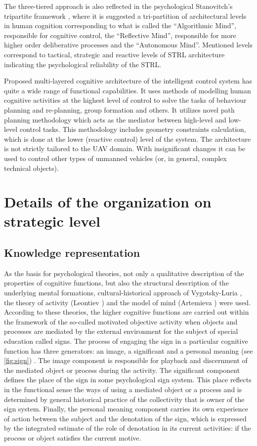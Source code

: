 \documentclass[review]{elsarticle}
\begin{document}
The three-tiered approach is also reflected in the psychological Stanovitch's tripartite framework \cite{Stanovich2009}, where it is suggested a tri-partition of architectural levels in human cognition corresponding to what is called the ``Algorithmic Mind'', responsible for cognitive control, the ``Reflective Mind'', responsible for more higher order deliberative processes and the ``Autonomous Mind''. Mentioned levels correspond to tactical, strategic and reactive levels of STRL architecture indicating the psychological reliability of the STRL.

Proposed multi-layered cognitive architecture of the intelligent control system has quite a wide range of functional capabilities. It uses methods of modelling human cognitive activities at the highest level of control to solve the tasks of behaviour planning and re-planning, group formation and others. It utilizes novel path planning methodology which acts as the mediator between high-level and low-level control tasks. This methodology includes geometry constraints calculation, which is done at the lower (reactive control) level of the system. The architecture is not strictly tailored to the UAV domain. With insignificant changes it can be used to control other types of unmanned vehicles (or, in general, complex technical objects).

\section{Details of the organization on strategic level}\label{sec:strategic}
\subsection{Knowledge representation}
As the basis for psychological theories, not only a qualitative description of the properties of cognitive functions, but also the structural description of the underlying mental formations, cultural-historical approach of Vygotsky-Luria \cite{Vygotsky1986}, the theory of activity (Leontiev \cite{Leontiev2009}) and the model of mind (Artemieva \cite{Artemieva1999}) were used. According to these theories, the higher cognitive functions are carried out within the framework of the so-called motivated objective activity when objects and processes are mediated by the external environment for the subject of special education called signs. The process of engaging the sign in a particular cognitive function has three generators: an image, a significant and a personal meaning (see \autoref{fig:sign}) \cite{Osipov2014}. The image component is responsible for playback and discernment of the mediated object or process during the activity. The significant component defines the place of the sign in some psychological sign system. This place reflects in the functional sense the ways of using a mediated object or a process and is determined by general historical practice of the collectivity that is owner of the sign system. Finally, the personal meaning component carries its own experience of action between the subject and the denotation of the sign, which is expressed by the integrated estimate of the role of denotation in its current activities: if the process or object satisfies the current motive.
\end{document}
